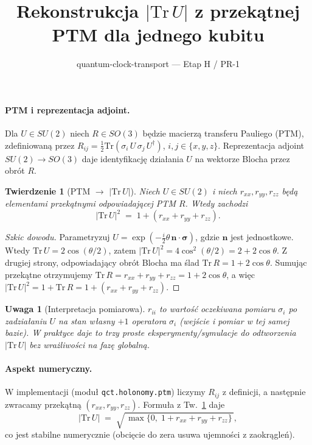 \documentclass[11pt]{article}
\title{Rekonstrukcja $|\mathrm{Tr}\,U|$ z przekątnej PTM dla jednego kubitu}
\author{quantum-clock-transport — Etap H / PR-1}
\date{}
\newtheorem{theorem}{Twierdzenie}
\newtheorem{remark}{Uwaga}
\begin{document}
\maketitle

\paragraph{PTM i reprezentacja adjoint.}
Dla $U\in SU(2)$ niech $R\in SO(3)$ będzie macierzą transferu Pauliego (PTM),
zdefiniowaną przez $R_{ij}=\frac{1}{2}\mathrm{Tr}(\sigma_i\,U\,\sigma_j\,U^\dagger)$,
$i,j\in\{x,y,z\}$. Reprezentacja adjoint $SU(2)\to SO(3)$ daje identyfikację działania $U$
na wektorze Blocha przez obrót $R$.

\begin{theorem}[PTM $\rightarrow$ $|\mathrm{Tr}\,U|$]\label{thm:ptm-trace}
Niech $U\in SU(2)$ i niech $r_{xx},r_{yy},r_{zz}$ będą elementami przekątnymi odpowiadającej PTM $R$.
Wtedy zachodzi
\begin{equation}
|\mathrm{Tr}\,U|^2 \;=\; 1 + (r_{xx}+r_{yy}+r_{zz}).
\end{equation}
\end{theorem}

\begin{proof}[Szkic dowodu]
Parametryzuj $U=\exp(-\tfrac{i}{2}\theta\,\bm{n}\cdot\bm{\sigma})$, gdzie $\bm{n}$ jest jednostkowe.
Wtedy $\mathrm{Tr}\,U=2\cos(\theta/2)$, zatem $|\mathrm{Tr}\,U|^2=4\cos^2(\theta/2)=2+2\cos\theta$.
Z drugiej strony, odpowiadający obrót Blocha ma ślad $\mathrm{Tr}\,R=1+2\cos\theta$.
Sumując przekątne otrzymujemy $\mathrm{Tr}\,R=r_{xx}+r_{yy}+r_{zz}=1+2\cos\theta$,
a więc $|\mathrm{Tr}\,U|^2=1+\mathrm{Tr}\,R=1+(r_{xx}+r_{yy}+r_{zz})$.
\end{proof}

\begin{remark}[Interpretacja pomiarowa]
$r_{ii}$ to wartość oczekiwana pomiaru $\sigma_i$ po zadziałaniu $U$ na stan własny $+1$ operatora $\sigma_i$
(wejście i pomiar w tej samej bazie). W praktyce daje to trzy proste eksperymenty/symulacje
do odtworzenia $|\mathrm{Tr}\,U|$ bez wrażliwości na fazę globalną.
\end{remark}

\paragraph{Aspekt numeryczny.}
W implementacji (moduł \texttt{qct.holonomy.ptm}) liczymy $R_{ij}$ z definicji,
a następnie zwracamy przekątną $(r_{xx},r_{yy},r_{zz})$.
Formuła z Tw.~\ref{thm:ptm-trace} daje
\[
|\mathrm{Tr}\,U| \;=\; \sqrt{\,\max\{0,\; 1 + r_{xx}+r_{yy}+r_{zz}\}\,},
\]
co jest stabilne numerycznie (obcięcie do zera usuwa ujemności z zaokrągleń).
\end{document}
